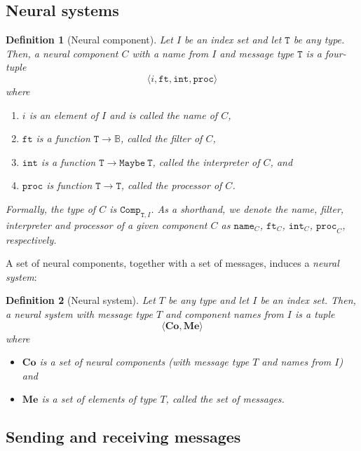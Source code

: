 \documentclass[]{scrartcl}
\theoremstyle{break}
\newtheorem{definition}{Definition}
\renewcommand{\tt}[1]{\texttt{#1}}
\newcommand{\B}{\mathbb{B}}
\newcommand{\type}[1]{\mathtt{#1}}
\begin{document}
\subsection{Neural systems}\label{sec:mathematicalNeuralSystem}

\begin{definition}[Neural component]
	Let $I$ be an index set and let $\type{T}$ be any type. Then, a neural component $C$ with a name from $I$ and message type $\type{T}$ is a four-tuple
	$$
		\langle i, \tt{ft}, \tt{int}, \tt{proc} \rangle
	$$
	where
	\begin{enumerate}
		\item $i$ is an element of $I$ and is called the {\em name} of $C$,
		\item $\tt{ft}$ is a function $\type{T \rightarrow \B}$, called the {\em filter} of $C$,
		\item $\tt{int}$ is a function $\type{T} \rightarrow \type{Maybe\ T}$, called the {\em interpreter} of $C$, and
		\item $\tt{proc}$ is function $\type{T} \rightarrow \type{T}$, called the {\em processor} of $C$.
	\end{enumerate}
	
	Formally, the type of $C$ is $\tt{Comp}_{\type{T},I}$. As a shorthand, we denote the name, filter, interpreter and processor of a given component $C$ as $\tt{name}_C$, $\tt{ft}_C$, $\tt{int}_C$, $\tt{proc}_C$, respectively.
\end{definition}

\noindent
A set of neural components, together with a set of messages, induces a {\em neural system}:

\begin{definition}[Neural system]
	Let $T$ be any type and let $I$ be an index set. Then, a neural system with message type $T$ and component names from $I$ is a tuple
	$$
		\langle \textbf{Co}, \textbf{Me} \rangle
	$$
	where
	\begin{itemize}
		\item $\textbf{Co}$ is a set of neural components (with message type $T$ and names from $I$) and
		\item $\textbf{Me}$ is a set of elements of type $T$, called the {\em set of messages}.
	\end{itemize}
\end{definition}

\subsection{Sending and receiving messages}\label{sec:notation}
\end{document}
